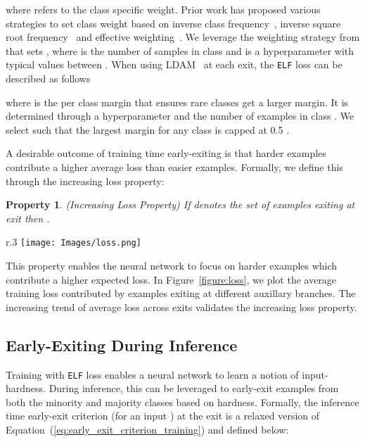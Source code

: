 \documentclass{article}
\newtheorem{property}{Property}
\newcommand{\method}{\texttt{ELF}\xspace}
\begin{document}
where  refers to the class specific weight. 
Prior work has proposed various strategies to set class weight  based on inverse class frequency~\cite{huang2016learning, wang2017learning}, inverse square root frequency~\cite{mikolov2013distributed, mahajan2018exploring} and effective weighting~\cite{cui2019class}. 
We leverage the weighting strategy from \cite{cui2019class} that sets , where  is the number of samples in class  and  is a hyperparameter with typical values between . 
When using LDAM~\cite{cao2019learning} at each exit, the \method{} loss can be described as follows



where  is the per class margin that ensures rare classes get a larger margin.
It is determined through a hyperparameter  and the number of examples  in class . 
We select  such that the largest margin for any class is capped at 0.5 \cite{cao2019learning}.


A desirable outcome of training time early-exiting is that harder examples contribute a higher average loss than easier examples.  
Formally, we define this through the increasing loss property:

\begin{property} (Increasing Loss Property) If  denotes the set of examples exiting at exit  then
. 
\label{prop:increasing_loss_property}
\end{property}

\begin{wrapfigure}{r}{.3\textwidth}
\centering
\vspace{-4mm}
    \texttt{[image: Images/loss.png]}
    \caption{Average per sample loss for images exiting at different exits on three datasets. The increasing trend validates Property~\ref{prop:increasing_loss_property}.
    }
    \label{figure:loss}
\vspace{-7mm}
\end{wrapfigure}


This property enables the neural network to focus on harder examples which contribute a higher expected loss.
In Figure~\ref{figure:loss}, we plot the average training loss contributed by examples exiting at different auxillary branches. 
The increasing trend of average loss across exits validates the increasing loss property. 


\subsection{Early-Exiting During Inference}
\label{subsec:exit_inference}
Training with \method{} loss enables a neural network to learn a notion of input-hardness. 
During inference, this can be leveraged to early-exit examples from both the minority and majority classes based on hardness.  
Formally, the inference time early-exit criterion  (for an input ) at the  exit is a relaxed version of Equation~(\ref{eq:early_exit_criterion_training}) and defined below:
\end{document}
